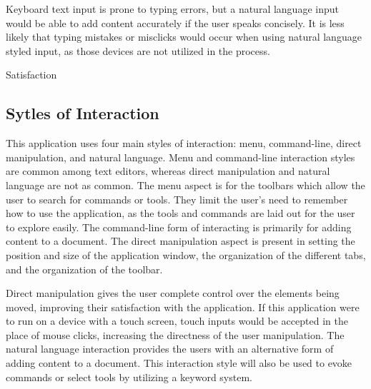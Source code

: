 \documentclass[11pt, oneside]{article}
\begin{document}
Keyboard text input is prone to typing errors, but a natural language input would be able to add content accurately if the user speaks concisely. It is less likely that typing mistakes or misclicks would occur when using natural language styled input, as those devices are not utilized in the process. 

Satisfaction



\subsection{Sytles of Interaction}
This application uses four main styles of interaction: menu, command-line, direct manipulation, and natural language. Menu and command-line interaction styles are common among text editors, whereas direct manipulation and natural language are not as common. The menu aspect is for the toolbars which allow the user to search for commands or tools. They limit the user's need to remember how to use the application, as the tools and commands are laid out for the user to explore easily. The command-line form of interacting is primarily for adding content to a document. The direct manipulation aspect is present in setting the position and size of the application window, the organization of the different tabs, and the organization of the toolbar. 

Direct manipulation gives the user complete control over the elements being moved, improving their satisfaction with the application. If this application were to run on a device with a touch screen, touch inputs would be accepted in the place of mouse clicks, increasing the directness of the user manipulation. The natural language interaction provides the users with an alternative form of adding content to a document. This interaction style will also be used to evoke commands or select tools by utilizing a keyword system. 


{}

\end{document}
